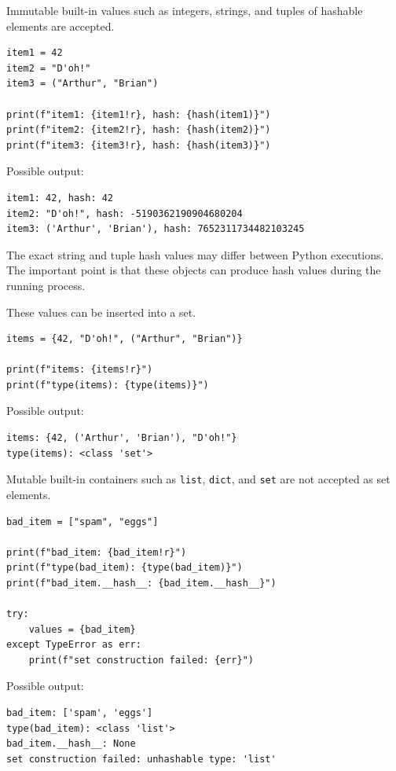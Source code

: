 Immutable built-in values such as integers, strings, and tuples of hashable elements are accepted.

\begin{verbatim}
item1 = 42
item2 = "D'oh!"
item3 = ("Arthur", "Brian")

print(f"item1: {item1!r}, hash: {hash(item1)}")
print(f"item2: {item2!r}, hash: {hash(item2)}")
print(f"item3: {item3!r}, hash: {hash(item3)}")
\end{verbatim}

Possible output:

\begin{verbatim}
item1: 42, hash: 42
item2: "D'oh!", hash: -5190362190904680204
item3: ('Arthur', 'Brian'), hash: 7652311734482103245
\end{verbatim}

The exact string and tuple hash values may differ between Python executions. The important point is that these objects can produce hash values during the running process.

These values can be inserted into a set.

\begin{verbatim}
items = {42, "D'oh!", ("Arthur", "Brian")}

print(f"items: {items!r}")
print(f"type(items): {type(items)}")
\end{verbatim}

Possible output:

\begin{verbatim}
items: {42, ('Arthur', 'Brian'), "D'oh!"}
type(items): <class 'set'>
\end{verbatim}

Mutable built-in containers such as \texttt{list}, \texttt{dict}, and \texttt{set} are not accepted as set elements.

\begin{verbatim}
bad_item = ["spam", "eggs"]

print(f"bad_item: {bad_item!r}")
print(f"type(bad_item): {type(bad_item)}")
print(f"bad_item.__hash__: {bad_item.__hash__}")

try:
    values = {bad_item}
except TypeError as err:
    print(f"set construction failed: {err}")
\end{verbatim}

Possible output:

\begin{verbatim}
bad_item: ['spam', 'eggs']
type(bad_item): <class 'list'>
bad_item.__hash__: None
set construction failed: unhashable type: 'list'
\end{verbatim}

